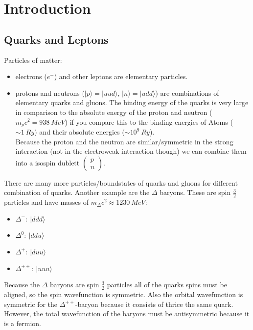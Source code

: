 \documentclass{include/thesisclass}
\newcommand{\rk}{\rangle}
\newcommand{\vektorz}[2]{\begin{pmatrix} #1 \\ #2 \end{pmatrix}}
\begin{document}
    \FrontMatter

    
    
    \begingroup \let\clearpage\relax    %
    \tableofcontents                    %
    \endgroup



    \MainMatter
\chapter{Introduction}
\section{Quarks and Leptons}
Particles of matter:
\begin{itemize}
	\item electrons ($e^-$) and other leptons are elementary particles. 
	\item protons and neutrons ($|p\rk = |uud\rk$, $|n\rk = |udd\rk$) are combinations of elementary quarks and gluons. The binding energy of the quarks is very large in comparison to the absolute energy of the proton and neutron ($m_pc^2 = 938~\si{MeV}$) if you compare this to the binding energies of Atoms ($\sim 1~\si{Ry}$) and their absolute energies ($\sim 10^9~\si{Ry}$).\\
		Because the proton and the neutron are similar/symmetric in the strong interaction (not in the electroweak interaction though) we can combine them into a isospin dublett $\vektorz{p}{n}$.
\end{itemize}
There are many more particles/boundstates of quarks and gluons for different combination of quarks. Another example are the $\Delta$ baryons. These are spin $\frac{3}{2}$ particles and have masses of $m_\Delta c^2 \approx 1230 ~\si{MeV}$:
\begin{itemize}
	\item $\Delta^-:~|ddd\rk$
	\item $\Delta^0:~|ddu\rk$
	\item $\Delta^+:~|duu\rk$
	\item $\Delta^{++}:~|uuu\rk$
\end{itemize}
Because the $\Delta$ baryons are spin $\frac{3}{2}$ particles all of the quarks spins must be aligned, so the spin wavefunction is symmetric. Also the orbital wavefunction is symmetric for the $\Delta^{++}$-baryon because it consists of thrice the same quark. However, the total wavefunction of the baryons must be antisymmetric because it is a fermion.\\
\end{document}

